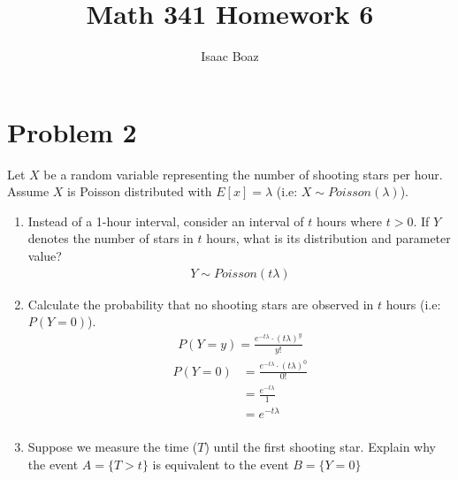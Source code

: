 \documentclass{article}
\title{\vspace{-4ex}Math 341 Homework 6}
\author{Isaac Boaz}
\begin{document}
\maketitle

\section*{Problem 2}

Let \(X\) be a random variable representing the number of shooting stars per hour. Assume \(X\) is Poisson distributed with \(E[x] = \lambda\) (i.e: \(X \sim Poisson(\lambda)\)).

\begin{enumerate}[label=\alph*)]
    \item Instead of a 1-hour interval, consider an interval of \(t\) hours where \(t > 0\). If \(Y\) denotes the number of stars in \(t\) hours, what is its distribution and parameter value?
          \begin{align*}
              Y \sim Poisson(t\lambda)
          \end{align*}
    \item Calculate the probability that no shooting stars are observed in \(t\) hours (i.e: \(P(Y = 0)\)).
          \begin{align*}
              P(Y = y) = \frac{e^{-t\lambda} \cdot (t\lambda)^y}{y!}
          \end{align*}
          \begin{align*}
              P(Y = 0) & = \frac{e^{-t\lambda} \cdot (t\lambda)^0}{0!} \\
                       & = \frac{e^{-t\lambda}}{1}                     \\
                       & = e^{-t\lambda}                               \\
          \end{align*}
    \item Suppose we measure the time (\(T\)) until the first shooting star. Explain why the event \(A = \{T > t\}\) is equivalent to the event \(B = \{Y = 0\}\)
\end{enumerate}
\end{document}
